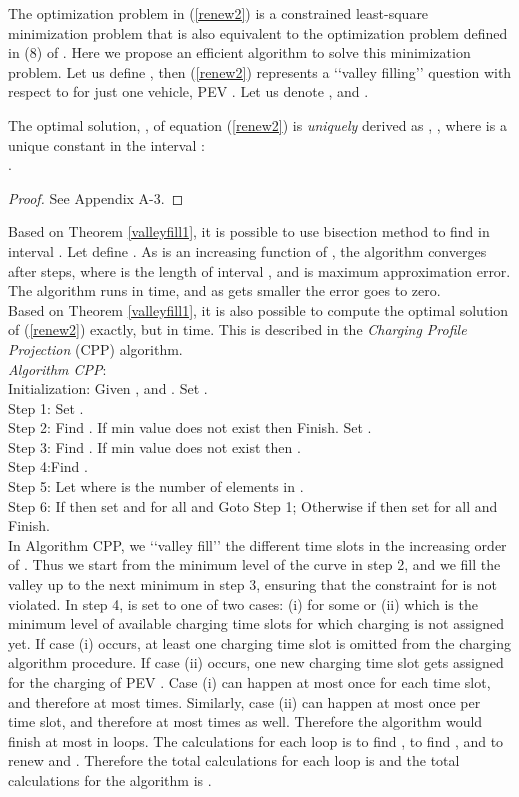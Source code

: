 \documentclass[12pt,draftcls,onecolumn]{IEEEtran}
\begin{document}
The optimization problem in (\ref{renew2}) is a constrained least-square minimization problem that is also equivalent to the optimization problem defined in (8) of \cite{GTL13}. Here we propose an efficient algorithm to solve this minimization problem. Let us define , then (\ref{renew2}) represents a \lq\lq{}valley filling\rq\rq{} question with respect to  for just one vehicle, PEV . Let us denote , and .
\begin{Thm}
The optimal solution, , of equation (\ref{renew2}) is \emph{uniquely} derived as , , where  is a unique constant in the interval :\\ .
\label{valleyfill1}
\end{Thm}
\begin{proof}
See Appendix A-3.
\end{proof}
\indent Based on Theorem \ref{valleyfill1}, it is possible to use bisection method to find  in interval . Let define . As  is an increasing function of , the algorithm converges after  steps, where  is the length of interval , and  is maximum approximation error. The algorithm runs in  time, and as  gets smaller the error goes to zero.\\
\indent Based on Theorem \ref{valleyfill1}, it is also possible to compute the optimal solution of (\ref{renew2}) exactly, but in  time. This is described in the \emph{Charging Profile Projection} (CPP) algorithm.\\
\noindent \textit{Algorithm CPP}: \\
\indent Initialization: Given ,  and . Set .\\
\indent Step 1: Set .\\
\indent Step 2: Find . If min value does not exist then Finish. Set .\\
\indent Step 3: Find . If min value does not exist then .\\
Step 4:Find .\\
\indent Step 5: Let  where  is the number of elements in .\\
\indent Step 6: If  then set  and  for all  and Goto Step 1; Otherwise if  then set  for all  and Finish.\\
\indent In Algorithm CPP, we \lq\lq{}valley fill\rq\rq{} the different time slots  in the increasing order of . Thus we start from the minimum level of the curve  in step 2, and we fill the valley up to the next minimum  in step 3, ensuring that the constraint for  is not violated. In step 4,  is set to one of two cases: (i)  for some  or (ii)  which is the minimum level of available charging time slots for which charging is not assigned yet. If case (i) occurs, at least one charging time slot is omitted from the charging algorithm procedure. If case (ii) occurs, one new charging time slot gets assigned for the charging of PEV . Case (i) can happen at most once for  each time slot, and therefore at most  times. Similarly, case (ii) can happen at most once per time slot, and therefore at most  times as well. Therefore the algorithm would finish at most in  loops. The calculations for each loop is  to find ,  to find  , and  to renew  and . Therefore the total calculations for each loop is  and the total calculations for the algorithm is .
\end{document}
